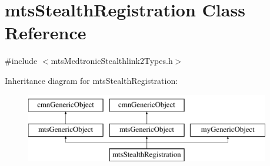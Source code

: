 \hypertarget{classmts_stealth_registration}{\section{mts\-Stealth\-Registration Class Reference}
\label{classmts_stealth_registration}
}


{\ttfamily \#include $<$mts\-Medtronic\-Stealthlink2\-Types.\-h$>$}

Inheritance diagram for mts\-Stealth\-Registration\-:\begin{figure}[H]
\begin{center}
\leavevmode
\includegraphics[height=3.000000cm]{db/d4a/classmts_stealth_registration}
\end{center}
\end{figure}
